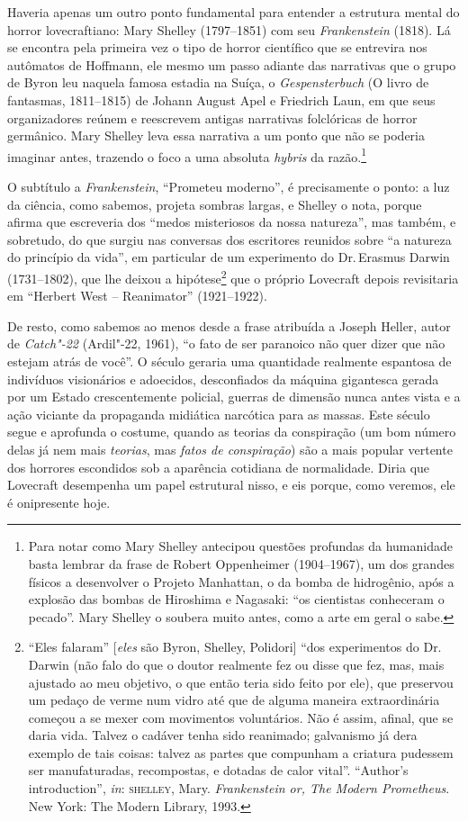 Haveria apenas um outro ponto fundamental para entender a estrutura
mental do horror lovecraftiano: Mary Shelley (1797--1851) com seu
\emph{Frankenstein} (1818). Lá se encontra pela primeira vez o tipo de
horror científico que se entrevira nos autômatos de Hoffmann, ele mesmo
um passo adiante das narrativas que o grupo de Byron leu naquela famosa
estadia na Suíça, o \emph{Gespensterbuch} (O livro de fantasmas, 1811--1815)
de Johann August Apel e Friedrich Laun, em que seus organizadores reúnem
e reescrevem antigas narrativas folclóricas de horror germânico. Mary
Shelley leva essa narrativa a um ponto que não se poderia imaginar
antes, trazendo o foco a uma absoluta \emph{hybris} da razão.\footnote{Para
  notar como Mary Shelley antecipou questões profundas da humanidade
  basta lembrar da frase de Robert Oppenheimer (1904--1967), um dos
  grandes físicos a desenvolver o Projeto Manhattan, o da bomba de
  hidrogênio, após a explosão das bombas de Hiroshima e Nagasaki: ``os
  cientistas conheceram o pecado''. Mary Shelley o soubera muito antes,
  como a arte em geral o sabe.}

O subtítulo a \emph{Frankenstein}, ``Prometeu moderno'', é precisamente
o ponto: a luz da ciência, como sabemos, projeta sombras largas, e
Shelley o nota, porque afirma que escreveria dos ``medos misteriosos da
nossa natureza'', mas também, e sobretudo, do que surgiu nas conversas
dos escritores reunidos sobre ``a natureza do princípio da vida'', em
particular de um experimento do Dr.\,Erasmus Darwin (1731--1802), que lhe
deixou a hipótese\footnote{``Eles falaram'' {[}\emph{eles} são Byron,
  Shelley, Polidori{]} ``dos experimentos do Dr.\,Darwin (não falo do que
  o doutor realmente fez ou disse que fez, mas, mais ajustado ao meu
  objetivo, o que então teria sido feito por ele), que preservou um
  pedaço de verme num vidro até que de alguma maneira extraordinária
  começou a se mexer com movimentos voluntários. Não é assim, afinal,
  que se daria vida. Talvez o cadáver tenha sido reanimado; galvanismo
  já dera exemplo de tais coisas: talvez as partes que compunham a
  criatura pudessem ser manufaturadas, recompostas, e dotadas de calor
  vital''. ``Author's introduction'', \emph{in}: \textsc{shelley}, Mary.
  \emph{Frankenstein or, The Modern Prometheus}. New York: The Modern
  Library, 1993.} que o próprio Lovecraft depois revisitaria em
``Herbert West -- Reanimator'' (1921--1922).

De resto, como sabemos ao menos desde a frase atribuída a Joseph Heller,
autor de \emph{Catch"-22} (Ardil"-22, 1961), ``o fato de ser
paranoico não quer dizer que não estejam atrás de você''. O século 
geraria uma quantidade realmente espantosa de indivíduos visionários e
adoecidos, desconfiados da máquina gigantesca gerada por um Estado
crescentemente policial, guerras de dimensão nunca antes vista e a ação
viciante da propaganda midiática narcótica para as massas. Este século
 segue e aprofunda o costume, quando as teorias da conspiração (um
bom número delas já nem mais \emph{teorias}, mas \emph{fatos de
conspiração}) são a mais popular vertente dos horrores escondidos sob a
aparência cotidiana de normalidade. Diria que Lovecraft desempenha um
papel estrutural nisso, e eis porque, como veremos, ele é onipresente
hoje.

